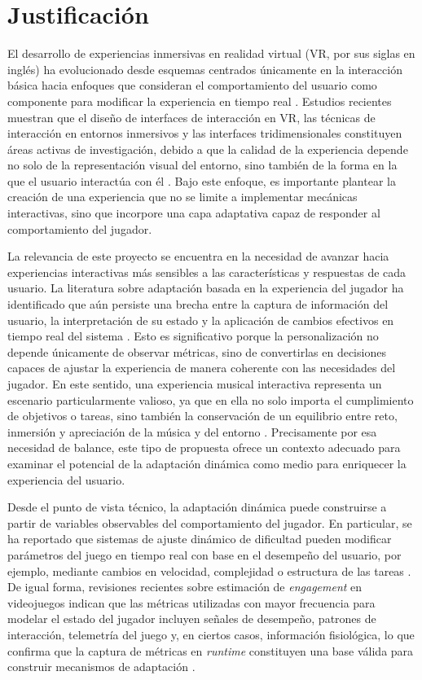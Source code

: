 \chapter{Justificación}

El desarrollo de experiencias inmersivas en realidad virtual (VR, 
por sus siglas en inglés) ha evolucionado desde esquemas 
centrados únicamente en la interacción básica hacia enfoques que
consideran el comportamiento del usuario como componente para 
modificar la experiencia en tiempo real \cite{lopes2025closing}. 
Estudios recientes muestran que el diseño de interfaces de 
interacción en VR, las técnicas de interacción en entornos 
inmersivos y las interfaces tridimensionales constituyen áreas
activas de investigación, debido a que la calidad de la 
experiencia depende no solo de la representación visual del 
entorno, sino también de la forma en la que el usuario interactúa 
con él \cite{chen2024interfaces,yeo2024interfaces}. Bajo este 
enfoque, es importante plantear la creación de una experiencia 
que no se limite a implementar mecánicas interactivas, sino que 
incorpore una capa adaptativa capaz de responder al 
comportamiento del jugador.

La relevancia de este proyecto se encuentra en la necesidad de 
avanzar hacia experiencias interactivas más sensibles a las 
características y respuestas de cada usuario. La literatura sobre
adaptación basada en la experiencia del jugador ha identificado 
que aún persiste una brecha entre la captura de información del 
usuario, la interpretación de su estado y la aplicación de 
cambios efectivos en tiempo real del sistema \cite{lopes2025closing}.
Esto es significativo porque la personalización no depende únicamente 
de observar métricas, sino de convertirlas en decisiones capaces de 
ajustar la experiencia de manera coherente con las necesidades del 
jugador. En este sentido, una experiencia musical interactiva representa 
un escenario particularmente valioso, ya que en ella no solo importa el 
cumplimiento de objetivos o tareas, sino también la conservación de un 
equilibrio entre reto, inmersión y apreciación de la música y del 
entorno \cite{pichlmair2007sound}. Precisamente por esa necesidad de 
balance, este tipo de propuesta ofrece un contexto adecuado para 
examinar el potencial de la adaptación dinámica como medio para 
enriquecer la experiencia del usuario.

Desde el punto de vista técnico, la adaptación dinámica puede 
construirse a partir de variables observables del comportamiento del 
jugador. En particular, se ha reportado que sistemas de ajuste dinámico 
de dificultad pueden modificar parámetros del juego en tiempo real con 
base en el desempeño del usuario, por ejemplo, mediante cambios en 
velocidad, complejidad o estructura de las tareas \cite{huber2021dda}.
De igual forma, revisiones recientes sobre estimación de 
\textit{engagement} en videojuegos indican que las métricas utilizadas 
con mayor frecuencia para modelar el estado del jugador incluyen señales 
de desempeño, patrones de interacción, telemetría del juego y, en ciertos 
casos, información fisiológica, lo que confirma que la captura de 
métricas en \textit{runtime} constituyen una base válida para construir 
mecanismos de adaptación \cite{rashed2025engagement}.

